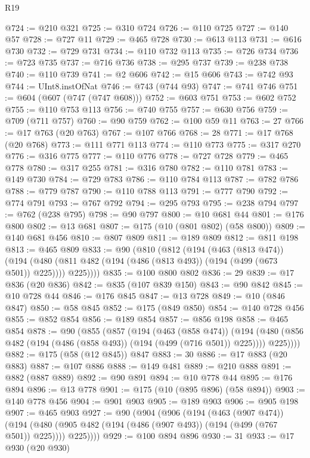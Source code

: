 \begin{lexlean}{R19}
\begin{coremodule}
@724 := @210 @321
@725 := @310 @724
@726 := @110 @725
@727 := @140 @57
@728 := @727 @11
@729 := @465 @728
@730 := @613 @113
@731 := @616 @730
@732 := @729 @731
@734 := @110 @732 @113
@735 := @726 @734
@736 := @723 @735
@737 := @716 @736
@738 := @295 @737
@739 := @238 @738
@740 := @110 @739
@741 := @2 @606
@742 := @15 @606
@743 := @742 @93
@744 := UInt8.instOfNat
@746 := @743 (@744 @93)
@747 := @741 @746
@751 := @604 (@607 (@747 (@747 @608)))
@752 := @603 @751
@753 := @602 @752
@755 := @110 @753 @113
@756 := @740 @755
@757 := @630 @756
@759 := @709 (@711 @757)
@760 := @90 @759
@762 := @100 @59 @11
@763 := 27
@766 := @17 @763 (@20 @763)
@767 := @107 @766
@768 := 28
@771 := @17 @768 (@20 @768)
@773 := @111 @771 @113
@774 := @110 @773
@775 := @317 @270
@776 := @316 @775
@777 := @110 @776
@778 := @727 @728
@779 := @465 @778
@780 := @317 @255
@781 := @316 @780
@782 := @110 @781
@783 := @149 @730
@784 := @729 @783
@786 := @110 @784 @113
@787 := @782 @786
@788 := @779 @787
@790 := @110 @788 @113
@791 := @777 @790
@792 := @774 @791
@793 := @767 @792
@794 := @295 @793
@795 := @238 @794
@797 := @762 (@238 @795)
@798 := @90 @797
@800 := @10 @681 @44
@801 := @176 @800
@802 := @13 @681
@807 := @175 (@10 (@801 @802) (@58 @800))
@809 := @140 @681 @456
@810 := @807 @809
@811 := @189 @809
@812 := @811 @198
@813 := @465 @809
@833 := @90
    (@810
      (@812
        (@194
          (@463 (@813 @474))
          (@194 (@480 (@811 @482 (@194 (@486 (@813 @493)) (@194 (@499 (@673 @501)) @225)))) @225))))
@835 := @100 @800 @802
@836 := 29
@839 := @17 @836 (@20 @836)
@842 := @835 (@107 @839 @150)
@843 := @90 @842
@845 := @10 @728 @44
@846 := @176 @845
@847 := @13 @728
@849 := @10 (@846 @847)
@850 := @58 @845
@852 := @175 (@849 @850)
@854 := @140 @728 @456
@855 := @852 @854
@856 := @189 @854
@857 := @856 @198
@858 := @465 @854
@878 := @90
    (@855
      (@857
        (@194
          (@463 (@858 @474))
          (@194 (@480 (@856 @482 (@194 (@486 (@858 @493)) (@194 (@499 (@716 @501)) @225)))) @225))))
@882 := @175 (@58 (@12 @845)) @847
@883 := 30
@886 := @17 @883 (@20 @883)
@887 := @107 @886
@888 := @149 @481
@889 := @210 @888
@891 := @882 (@887 @889)
@892 := @90 @891
@894 := @10 @778 @44
@895 := @176 @894
@896 := @13 @778
@901 := @175 (@10 (@895 @896) (@58 @894))
@903 := @140 @778 @456
@904 := @901 @903
@905 := @189 @903
@906 := @905 @198
@907 := @465 @903
@927 := @90
    (@904
      (@906
        (@194
          (@463 (@907 @474))
          (@194 (@480 (@905 @482 (@194 (@486 (@907 @493)) (@194 (@499 (@767 @501)) @225)))) @225))))
@929 := @100 @894 @896
@930 := 31
@933 := @17 @930 (@20 @930)

\end{coremodule}
\end{lexlean}
